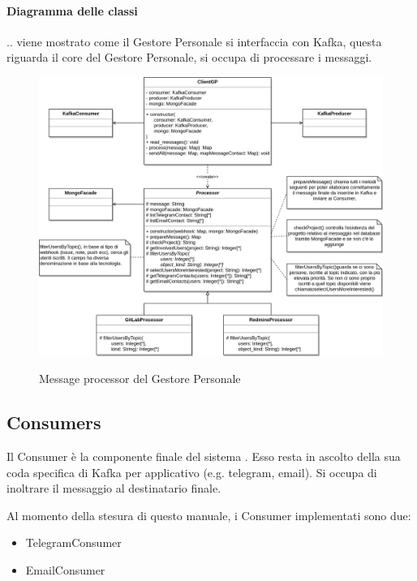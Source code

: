     \paragraph{Diagramma delle classi}
    .. viene mostrato come il Gestore Personale si interfaccia con Kafka, questa riguarda il core del Gestore Personale, si occupa di processare
    i messaggi.

    \begin{figure}[H]
        \centering
        \includegraphics[width=\textwidth]{img/GP-Processor.png}\\
        \caption{Message processor del Gestore Personale}
        \label{fig:GP-Processor}
    \end{figure}




\subsection{Consumers}
Il Consumer è la componente finale del sistema \progetto. Esso resta in ascolto della sua coda specifica di Kafka per applicativo (e.g. telegram, email).
Si occupa di inoltrare il messaggio al destinatario finale.

Al momento della stesura di questo manuale, i Consumer implementati sono due:

\begin{itemize}
    \item TelegramConsumer
    \item EmailConsumer
\end{itemize}

